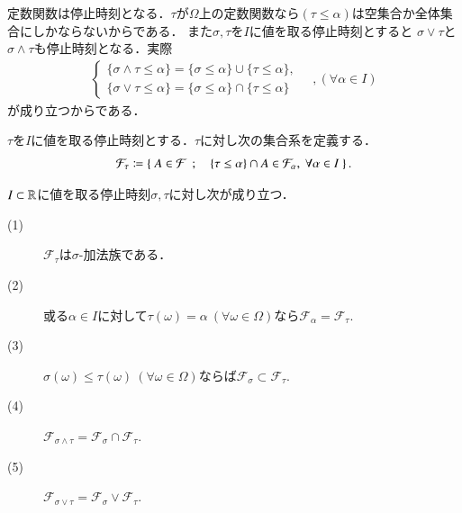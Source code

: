 	定数関数は停止時刻となる．$\tau$が$\Omega$上の定数関数なら$(\tau \leq \alpha)$は空集合か全体集合にしかならないからである．
	また$\sigma,\tau$を$I$に値を取る停止時刻とすると
	$\sigma \vee \tau$と$\sigma \wedge \tau$も停止時刻となる．実際
	\begin{align}
		\begin{cases}
			\{ \sigma \wedge \tau \leq \alpha \} = \{ \sigma \leq \alpha \} \cup \{ \tau \leq \alpha \}, \\
			\{ \sigma \vee \tau \leq \alpha \} = \{ \sigma \leq \alpha \} \cap \{ \tau \leq \alpha \}
		\end{cases}
		\quad ,(\forall \alpha \in I)
	\end{align}
	が成り立つからである．
	
	\begin{itembox}[l]{}
		\begin{dfn}[停止時刻の前に決まっている事象系]
			$\tau$を$I$に値を取る停止時刻とする．$\tau$に対し次の集合系を定義する．
			\begin{align}
				\mathcal{F}_\tau \coloneqq \left\{\ A \in \mathcal{F}\ \, ; \quad \{ \tau \leq \alpha \} \cap A \in \mathcal{F}_\alpha,\ \forall \alpha \in I\ \right\}.
			\end{align}
		\end{dfn}
	\end{itembox}
	\begin{itembox}[l]{}
		\begin{prp}[停止時刻の性質]
			$I \subset \mathbb{R}$に値を取る停止時刻$\sigma, \tau$に対し次が成り立つ．
			\begin{description}
				\item[(1)] $\mathcal{F}_\tau$は$\sigma$-加法族である．
				\item[(2)] 或る$\alpha \in I$に対して$\tau(\omega) = \alpha\ (\forall \omega \in \Omega)$なら$\mathcal{F}_\alpha = \mathcal{F}_\tau$.
				\item[(3)] $\sigma(\omega) \leq \tau(\omega)\ (\forall \omega \in \Omega)$ならば$\mathcal{F}_\sigma \subset \mathcal{F}_\tau$.
				\item[(4)] $\mathcal{F}_{\sigma \wedge \tau} = \mathcal{F}_\sigma \cap \mathcal{F}_\tau$.
				\item[(5)] $\mathcal{F}_{\sigma \vee \tau} = \mathcal{F}_\sigma \vee \mathcal{F}_\tau$.
			\end{description}
			\label{prp:properties_of_stopping_times}
		\end{prp}
	\end{itembox}
	
